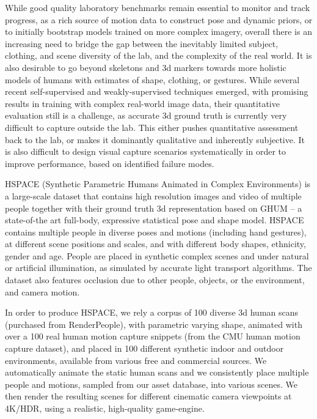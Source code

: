 \documentclass[10pt,twocolumn,letterpaper]{article}
\begin{document}
While good quality laboratory benchmarks remain essential to monitor and track progress, as a rich source of motion data to construct pose and dynamic priors, or to initially bootstrap models trained on more complex imagery, overall there is an increasing need to bridge the gap between the inevitably limited subject, clothing, and scene diversity of the lab, and the complexity of the real world. It is also desirable to go beyond skeletons and 3d markers towards more holistic models of humans with estimates of shape, clothing, or gestures. While several recent self-supervised and weakly-supervised techniques emerged, with promising results in training with complex real-world image data\cite{zanfir2020weakly,joo2020exemplar,kolotouros2019learning}, their quantitative evaluation still is a challenge, as accurate 3d ground truth is currently very difficult to capture outside the lab. This either pushes quantitative assessment back to the lab, or makes it dominantly qualitative and inherently subjective. It is also difficult to design visual capture scenarios systematically in order to improve performance, based on identified failure modes.

HSPACE (Synthetic Parametric Humans Animated in Complex Environments) is a large-scale dataset that contains high resolution images and video of multiple people together with their ground truth 3d representation based on GHUM -- a state-of-the art full-body, expressive statistical pose and shape model. HSPACE contains multiple people in diverse poses and motions (including hand gestures), at different scene positions and scales, and with different body shapes, ethnicity, gender and age. People are placed in synthetic complex scenes and under natural or artificial illumination, as simulated by accurate light transport algorithms. The dataset also features occlusion due to other people, objects, or the environment, and camera motion. 

In order to produce HSPACE, we rely a corpus of 100 diverse 3d human scans (purchased from RenderPeople\cite{Renderpeople.com}), with parametric varying shape, animated with over a 100 real human motion capture snippets (from the CMU human motion capture dataset), and placed in 100 different synthetic indoor and outdoor environments, available from various free and commercial sources. We automatically animate the static human scans and we consistently place multiple people and motions, sampled from our asset database, into various scenes. We then render the resulting scenes for different cinematic camera viewpoints at 4K/HDR, using a realistic, high-quality game-engine.
\end{document}
